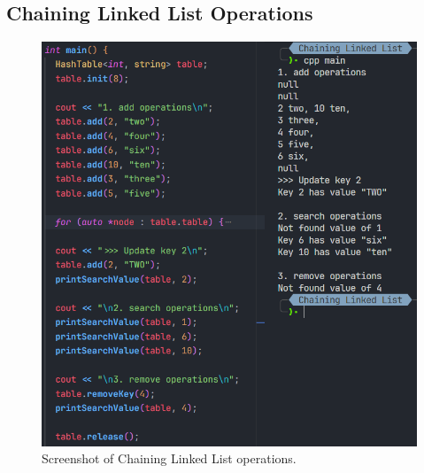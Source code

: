 \pagebreak
\subsection{Chaining Linked List Operations}
\begin{figure}[!ht]
	\centering
	\includegraphics[width=\textwidth]{imgs/Chaining Linked List/operations.png}
	\caption{Screenshot of Chaining Linked List operations.}\label{fig:chainingll-operations}
\end{figure}